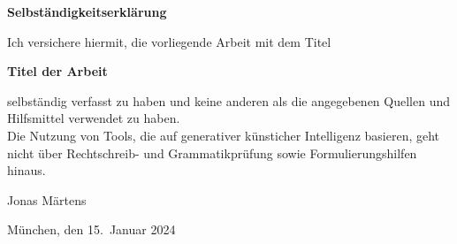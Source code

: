 \thispagestyle{empty}
\vspace*{1cm}
{\huge \textbf{Selbständigkeitserklärung}}\\
\vspace*{1.5cm}

Ich versichere hiermit, die vorliegende Arbeit mit dem Titel

\begin{center}
    \textbf{Titel der Arbeit}
\end{center}

selbständig verfasst zu haben und keine anderen als die angegebenen Quellen und Hilfsmittel verwendet zu haben.
\\
Die Nutzung von Tools, die auf generativer künsticher Intelligenz basieren, geht nicht über Rechtschreib- und Grammatikprüfung sowie Formulierungshilfen hinaus.

\vspace*{3cm}

Jonas Märtens

\vspace*{1cm}
München, den 15.~Januar 2024

